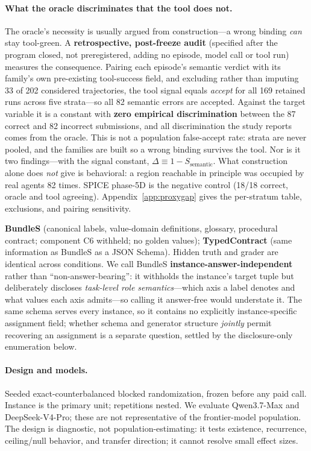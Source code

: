 \documentclass{article}
\begin{document}
\paragraph{What the oracle discriminates that the tool does not.}
\label{sec:proxygap}
The oracle's necessity is usually argued from construction---a wrong binding \emph{can} stay tool-green. A \textbf{retrospective, post-freeze audit} (specified after the program closed, not preregistered, adding no episode, model call or tool run) measures the consequence. Pairing each episode's semantic verdict with its family's own pre-existing tool-success field, and excluding rather than imputing 33 of 202 considered trajectories, the tool signal equals \emph{accept} for all 169 retained runs across five strata---so all 82 semantic errors are accepted. Against the target variable it is a constant with \textbf{zero empirical discrimination} between the 87 correct and 82 incorrect submissions, and all discrimination the study reports comes from the oracle. This is not a population false-accept rate: strata are never pooled, and the families are built so a wrong binding survives the tool. Nor is it two findings---with the signal constant, $\Delta\equiv 1-S_{\text{semantic}}$. What construction alone does \emph{not} give is behavioral: a region reachable in principle was occupied by real agents 82 times. SPICE phase-5D is the negative control (18/18 correct, oracle and tool agreeing). Appendix~\ref{app:proxygap} gives the per-stratum table, exclusions, and pairing sensitivity.

 \textbf{BundleS} (canonical labels, value-domain definitions, glossary, procedural contract; component C6 withheld; no golden values); \textbf{TypedContract} (same information as BundleS as a JSON Schema). Hidden truth and grader are identical across conditions. We call BundleS \textbf{instance-answer-independent} rather than ``non-answer-bearing'': it withholds the instance's target tuple but deliberately discloses \emph{task-level role semantics}---which axis a label denotes and what values each axis admits---so calling it answer-free would understate it. The same schema serves every instance, so it contains no explicitly instance-specific assignment field; whether schema and generator structure \emph{jointly} permit recovering an assignment is a separate question, settled by the disclosure-only enumeration below.

\paragraph{Design and models.} Seeded exact-counterbalanced blocked randomization, frozen before any paid call. Instance is the primary unit; repetitions nested. We evaluate Qwen3.7-Max and DeepSeek-V4-Pro; these are not representative of the frontier-model population. The design is diagnostic, not population-estimating: it tests existence, recurrence, ceiling/null behavior, and transfer direction; it cannot resolve small effect sizes.
\end{document}
